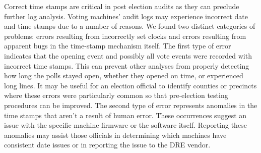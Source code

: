 \label{an:date} 

Correct time stamps are critical in post election audits as they can preclude further log analysis.  Voting machines' audit logs may experience incorrect date and time stamps due to a number of reasons.  We found two distinct categories of problems: errors resulting from incorrectly set clocks and errors resulting from apparent bugs in the time-stamp mechanism itself.  The first type of error indicates that the opening event and possibly all vote events were recorded with incorrect time stamps.  This can prevent other analyses from properly detecting how long the polls stayed open, whether they opened on time, or experienced long lines.  It may be useful for an election official to identify counties or precincts where these errors were particularly common so that pre-election testing procedures can be improved.  The second type of error represents anomalies in the time stamps that aren't a result of human error.  These occurrences suggest an issue with the specific machine firmware or the software itself.  Reporting these anomalies may assist those officials in determining which machines have consistent date issues or in reporting the issue to the DRE vendor.  

